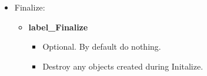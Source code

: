 \begin{itemize}
\begin{itemize}
    \begin{itemize}
      \item Optional. By default check the timestamp of all import fields against the current time of the internal clock.
    \end{itemize}
    \item {\bf label\_SetRunClock}
    \begin{itemize}
      \item Optional. By default do not adjust the internal clock when entering Run.
    \end{itemize}
    \item {\bf label\_TimestampExport}
    \begin{itemize}
      \item Optional. By default timestamp all export fields according to the current time of the component internal clock at the {\em beginning} of the Advance step.
    \end{itemize}
  \end{itemize}
  \item Finalize:
  \begin{itemize}
    \item {\bf label\_Finalize}
    \begin{itemize}
      \item Optional. By default do nothing.
      \item Destroy any objects created during Initalize.
    \end{itemize}
  \end{itemize}
\end{itemize}

\mbox{}\hrulefill\ 

